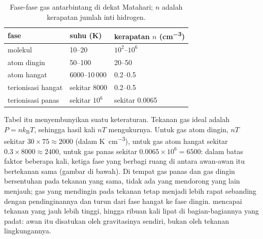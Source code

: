 \begin{table}[htbp]
\centering
\small
\begin{tabular}{lll}
\hline
fase & suhu (K) & kerapatan $n$ (\unit{cm^{-3}}) \\
\hline
molekul & 10--20 & $10^2$--$10^6$ \\
atom dingin & 50--100 & 20--50 \\
atom hangat & 6000--10\,000 & 0.2--0.5 \\
terionisasi hangat & sekitar 8000 & 0.2--0.5 \\
terionisasi panas & sekitar $10^6$ & sekitar 0.0065 \\
\hline
\end{tabular}
\caption{Fase-fase gas antarbintang di dekat Matahari; $n$ adalah kerapatan jumlah
inti hidrogen.}
\label{tab:b2:ism-star-formation:phases}
\end{table}

Tabel itu menyembunyikan suatu keteraturan. Tekanan gas ideal adalah
$P = n k_{\mathrm B} T$, sehingga hasil kali $nT$ mengukurnya. Untuk gas atom dingin,
$nT$ sekitar $30\times75 \approx 2000$ (dalam \unit{K.cm^{-3}}), untuk gas atom
hangat sekitar $0.3\times8000 \approx 2400$, untuk gas panas sekitar
$0.0065\times10^6 = 6500$: dalam batas faktor beberapa kali, ketiga fase yang
berbagi ruang di antara awan-awan itu bertekanan sama (gambar di bawah).
Di tempat gas panas dan gas dingin bersentuhan pada tekanan yang sama, tidak ada yang
mendorong yang lain menjauh; gas yang mendingin pada tekanan tetap menjadi lebih rapat
sebanding dengan pendinginannya dan turun dari fase hangat ke fase dingin.  mencapai tekanan yang jauh lebih tinggi, hingga ribuan kali lipat di bagian-bagiannya yang padat: awan itu disatukan oleh gravitasinya sendiri, bukan oleh
tekanan lingkungannya.

